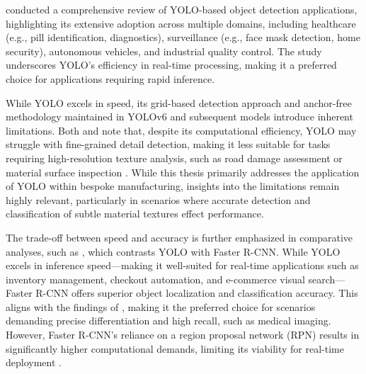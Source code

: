 \documentclass[a4paper,10pt,twocolumn]{article}
\numberwithin{figure}{section}
\numberwithin{table}{section}
\begin{document}
 \cite{Sapkota2025YOLOv11} conducted a comprehensive review of YOLO-based 
 object detection applications, highlighting its extensive adoption across 
 multiple domains, including healthcare (e.g., pill identification, diagnostics), 
 surveillance (e.g., face mask detection, home security), 
 autonomous vehicles, and industrial quality control. 
 The study underscores YOLO’s efficiency in real-time processing, 
 making it a preferred choice for applications requiring rapid inference.

 While YOLO excels in speed, its grid-based detection approach and anchor-free
  methodology maintained in YOLOv6 and subsequent models introduce inherent limitations. 
  Both \cite{Sapkota2025YOLOv11}
   and \cite{he2024comprehensiveperformanceevaluationyolov11} note that, despite 
   its computational efficiency, YOLO may struggle with fine-grained detail detection, 
   making it less suitable for tasks requiring high-resolution texture analysis, 
   such as road damage assessment or material surface inspection \citep{Angulo_2019}. 
   While this thesis primarily addresses the application of YOLO within bespoke manufacturing, 
   insights into the limitations remain highly relevant, particularly in scenarios 
   where accurate detection and classification of subtle material textures effect performance.
    
   The trade-off between speed and accuracy is further emphasized in comparative 
   analyses, such as \cite{articleRANE}, which contrasts YOLO with Faster R-CNN. 
   While YOLO excels in inference speed—making it well-suited for real-time applications 
   such as inventory management, checkout automation, and e-commerce visual search—Faster 
   R-CNN offers superior object localization and classification accuracy. 
   This aligns with the findings of \cite{Sapkota2025YOLOv11}, making it the preferred choice 
   for scenarios demanding precise differentiation and high recall, such as medical imaging. 
   However, Faster R-CNN's reliance on a region proposal 
   network (RPN) results in significantly higher computational demands, limiting its 
   viability for real-time deployment \citep{articleRANE}.
\end{document}
